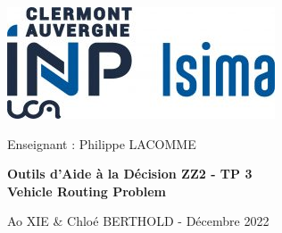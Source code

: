 \documentclass[12pt]{article}
\begin{document}
    \def\arraystretch{1.5}
    
        \includegraphics[scale = 0.8]{Photos/isima.jpg}  
        \hfill
        \begin{large}
            Enseignant : Philippe LACOMME
        \end{large}
        
    \vspace{5cm}
    \begin{center}
        \begin{Huge}
            \textbf{Outils d'Aide à la Décision ZZ2 - TP 3}
            \\
            \vspace{0.3cm}
            \textbf{Vehicle Routing Problem}
        \end{Huge}
    \end{center}
    
    \begin{center}
        \begin{large}
            Ao XIE \& Chloé BERTHOLD - Décembre 2022
        \end{large}
    \end{center}
    
\end{document}
